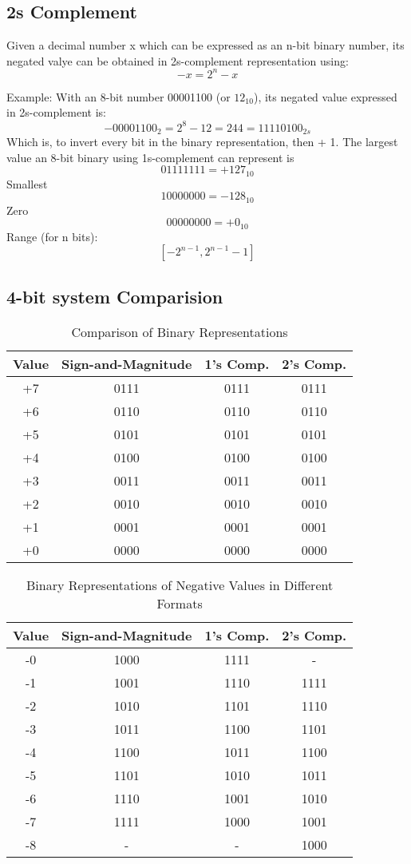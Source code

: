 \documentclass[12pt]{article} %
\begin{document}
\subsection{2s Complement}
Given a decimal number x which can be expressed as an n-bit binary number, its negated valye can be obtained in 2s-complement representation using:
\[-x = 2^n -x\]

Example: With an 8-bit number 00001100 (or \(12_{10}\)), its negated value expressed in 2s-complement is:
\[-00001100_2 = 2^8 - 12 = 244 = 11110100_{2s}\]
Which is, to invert every bit in the binary representation, then + 1.
The largest value an 8-bit binary using 1s-complement can represent is 
\[01111111 = +127_{10}\]
Smallest
\[10000000 = -128_{10}\]
Zero
\[00000000 = +0_{10}\]
Range (for n bits): 
\[[-2^{n - 1}, 2^{n - 1} - 1]\]
\newpage
\subsection*{4-bit system Comparision}
\begin{table}[h!]
    \centering
    \begin{tabular}{|c|c|c|c|}
    \hline
    \textbf{Value} & \textbf{Sign-and-Magnitude} & \textbf{1's Comp.} & \textbf{2's Comp.} \\
    \hline
    +7 & 0111 & 0111 & 0111 \\
    +6 & 0110 & 0110 & 0110 \\
    +5 & 0101 & 0101 & 0101 \\
    +4 & 0100 & 0100 & 0100 \\
    +3 & 0011 & 0011 & 0011 \\
    +2 & 0010 & 0010 & 0010 \\
    +1 & 0001 & 0001 & 0001 \\
    +0 & 0000 & 0000 & 0000 \\
    \hline
    \end{tabular}
    \caption{Comparison of Binary Representations}
    \end{table}
    
\begin{table}[h!]
    \centering
    \begin{tabular}{|c|c|c|c|}
    \hline
    \textbf{Value} & \textbf{Sign-and-Magnitude} & \textbf{1's Comp.} & \textbf{2's Comp.} \\
    \hline
    -0 & 1000 & 1111 & - \\
    -1 & 1001 & 1110 & 1111 \\
    -2 & 1010 & 1101 & 1110 \\
    -3 & 1011 & 1100 & 1101 \\
    -4 & 1100 & 1011 & 1100 \\
    -5 & 1101 & 1010 & 1011 \\
    -6 & 1110 & 1001 & 1010 \\
    -7 & 1111 & 1000 & 1001 \\
    -8 & -    & -    & 1000 \\
    \hline
    \end{tabular}
    \caption{Binary Representations of Negative Values in Different Formats}
    \end{table}
\end{document}

